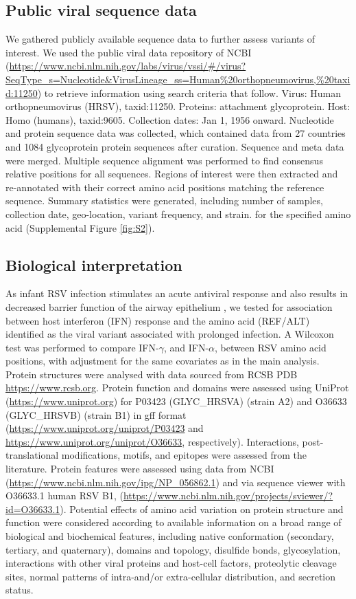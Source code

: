 \documentclass{article} %
\begin{document}
\subsection{Public viral sequence data}
We gathered publicly available sequence data to further assess variants of interest. 
We used the public viral data repository of NCBI 
(\url{https://www.ncbi.nlm.nih.gov/labs/virus/vssi/#/virus?SeqType_s=Nucleotide&VirusLineage_ss=Human\%20orthopneumovirus,\%20taxid:11250})
to retrieve information using search criteria that follow. Virus: Human orthopneumovirus (HRSV), taxid:11250. 
Proteins: attachment glycoprotein. Host: Homo (humans), taxid:9605. 
Collection dates: Jan 1, 1956 onward. 
Nucleotide and protein sequence data was collected, which contained data from 27 countries and 1084 glycoprotein protein sequences after curation. 
Sequence and meta data were merged. 
Multiple sequence alignment was performed to find consensus relative positions for all sequences. 
Regions of interest were then extracted and re-annotated with their correct amino acid positions matching the reference sequence. Summary statistics were generated, including number of samples, collection date, geo-location, variant frequency, and strain. for the specified amino acid 
(Supplemental Figure \ref{fig:S2}).

\subsection{Biological interpretation}
\label{sec:Supplemental_end} 
As infant RSV infection stimulates an acute antiviral response and also results in decreased barrier function of the airway epithelium \citep{connelly2021metabolic}, we tested for association between host interferon (IFN) response and the amino acid (REF/ALT) identified as the viral variant associated with prolonged infection. 
A Wilcoxon test was performed to compare IFN-$\gamma$, and IFN-$\alpha$, between RSV amino acid positions, with adjustment for the same covariates as in the main analysis. 
Protein structures were analysed with data sourced from RCSB PDB \url{https://www.rcsb.org}. 
Protein function and domains were assessed using UniProt	(\url{https://www.uniprot.org}) for P03423 (GLYC\_HRSVA) (strain A2) and O36633 (GLYC\_HRSVB) (strain B1) in gff format (\url{https://www.uniprot.org/uniprot/P03423} and
\url{https://www.uniprot.org/uniprot/O36633}, respectively). 
Interactions, post-translational modifications, motifs, and epitopes were assessed from the literature. 
Protein features were assessed using data from NCBI (\url{https://www.ncbi.nlm.nih.gov/ipg/NP_056862.1}) and via sequence viewer with O36633.1 human RSV B1, 
(\url{https://www.ncbi.nlm.nih.gov/projects/sviewer/?id=O36633.1}). 
Potential effects of amino acid variation on protein structure and function were considered according to available information on a broad range of biological and biochemical features, including native conformation (secondary, tertiary, and quaternary), domains and topology, disulfide bonds, glycosylation, interactions with other viral proteins and host-cell factors, proteolytic cleavage sites, normal patterns of intra-and/or extra-cellular distribution, and secretion status.
\end{document}
